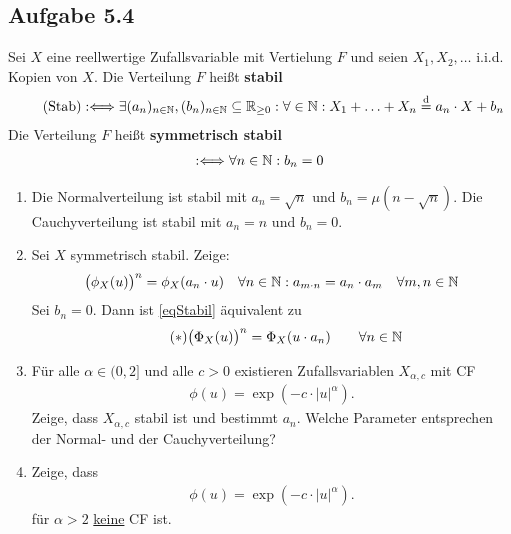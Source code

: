 \subsection{Aufgabe 5.4}
Sei $X$ eine reellwertige Zufallsvariable mit Vertielung $F$ und seien $X_1,X_2,\ldots$ i.i.d. Kopien von $X$.
Die Verteilung $F$ heißt \textbf{stabil}
\begin{align}\label{eqStabil}\tag{Stab}
	:\Longleftrightarrow
	\exists(a_n)_{n\in\mathbb{N}},(b_n)_{n\in\mathbb{N}}\subseteq\mathbb{R}_{\geq0}:\forall\in\mathbb{N}:
	X_1+\ldots+X_n\overset{\mathrm{d}}{=}a_n\cdot X+b_n
\end{align}
Die Verteilung $F$ heißt \textbf{symmetrisch stabil}
\begin{align*}
	:\Longleftrightarrow
	\forall n\in\mathbb{N}:b_n=0
\end{align*}

\begin{enumerate}[label=\alph*)]
	\item Die Normalverteilung ist stabil mit $a_n=\sqrt{n}$ und $b_n=\mu(n-\sqrt{n})$.
	Die Cauchyverteilung ist stabil mit $a_n=n$ und $b_n=0$.
	\item Sei $X$ symmetrisch stabil.
	Zeige:
	\begin{align*}
		\big(\phi_X(u)\big)^n&=\phi_X(a_n\cdot u) & \forall n\in\mathbb{N}:
		a_{m\cdot n}&=a_n\cdot a_m &\forall m,n\in\mathbb{N}
	\end{align*}		
	Sei $b_n=0$. Dann ist \eqref{eqStabil} äquivalent zu
	\begin{align}\label{eq4Stern}\tag{$\ast$}
		\big(\Phi_X(u)\big)^n=\Phi_X(u\cdot a_n)\qquad\forall n\in\mathbb{N}
	\end{align}
	\item Für alle $\alpha\in(0,2]$ und alle $c>0$ existieren Zufallsvariablen $X_{\alpha,c}$ mit CF 
	\begin{align*}
		\phi(u)=\exp\left(-c\cdot|u|^\alpha\right).
	\end{align*}
	Zeige, dass $X_{\alpha,c}$ stabil ist und bestimmt $a_n$.
	Welche Parameter entsprechen der Normal- und der Cauchyverteilung?
	\item Zeige, dass
	\begin{align*}
		\phi(u)=\exp\left(-c\cdot|u|^\alpha\right).
	\end{align*}
	für $\alpha>2$ \ul{keine} CF ist.
\end{enumerate}

